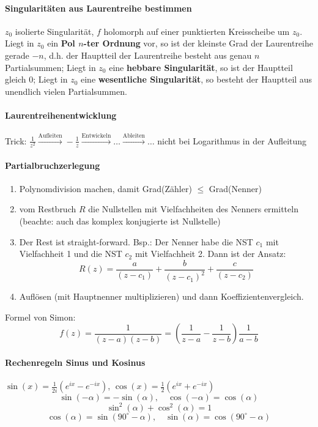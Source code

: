 \documentclass[a4paper, 10pt, DIV20, headings=small]{scrartcl}
\theoremstyle{definition}
\theoremstyle{plain}
\begin{document}
\paragraph{Singularitäten aus Laurentreihe bestimmen}
$z_0$ isolierte Singularität, $f$ holomorph auf einer punktierten Kreisscheibe um $z_0$.
	Liegt in $z_0$ ein \textbf{Pol $n$-ter Ordnung} vor, so ist der kleinste Grad der Laurentreihe gerade $-n$, d.h. der Hauptteil der Laurentreihe besteht aus genau $n$ Partialsummen; 
	Liegt in $z_0$ eine \textbf{hebbare Singularität}, so ist der Hauptteil gleich $0$; 
	Liegt in $z_0$ eine \textbf{wesentliche Singularität}, so besteht der Hauptteil aus unendlich vielen Partialsummen.

\paragraph{Laurentreihenentwicklung}
Trick: $\frac{1}{z^2} \overset{\text{Aufleiten}}{\rightarrow} -\frac{1}{z} \overset{\text{Entwickeln}}{\rightarrow} \ldots \overset{\text{Ableiten}}{\rightarrow} \ldots$ nicht bei Logarithmus in der Aufleitung

\paragraph{Partialbruchzerlegung}
\begin{enumerate}
\item Polynomdivision machen, damit Grad(Zähler) $\leq$ Grad(Nenner)
\item vom Restbruch $R$ die Nullstellen mit Vielfachheiten des Nenners ermitteln (beachte: auch das komplex konjugierte ist Nullstelle)
\item Der Rest ist straight-forward. Bsp.: Der Nenner habe die NST $c_1$ mit Vielfachheit 1 und die NST $c_2$ mit Vielfachheit 2. Dann ist der Ansatz: $$R(z) = \frac{a}{(z-c_1)} + \frac{b}{(z-c_1)^2} + \frac{c}{(z-c_2)}$$
\item Auflösen (mit Hauptnenner multiplizieren) und dann Koeffizientenvergleich.
\end{enumerate}
Formel von Simon:
$$f(z) = \frac{1}{(z-a)(z-b)} = \left(\frac{1}{z-a} - \frac{1}{z-b}\right) \frac{1}{a-b}$$

\paragraph{Rechenregeln Sinus und Kosinus}
$\sin(x) = \frac{1}{2i} (e^{ix}-e^{-ix})$, $\cos(x) = \frac{1}{2} (e^{ix}+e^{-ix})$
$$\sin(-\alpha) = - \sin(\alpha), \quad \cos(-\alpha) = \cos(\alpha)$$
$$\sin^2(\alpha) + \cos^2(\alpha) = 1$$
$$\cos(\alpha) = \sin(90^\circ - \alpha), \quad \sin(\alpha) = \cos(90^\circ - \alpha)$$
\end{document}
